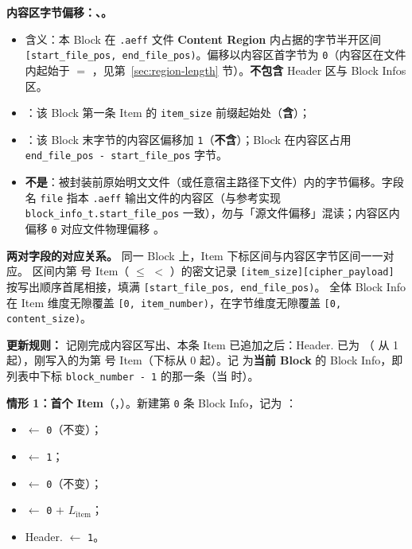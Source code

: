 \textbf{内容区字节偏移：、。}
\begin{itemize}
  \item 含义：本 Block 在 \texttt{.aeff} 文件 \textbf{Content Region} 内占据的字节半开区间 \texttt{[start\_file\_pos, end\_file\_pos)}。偏移以内容区首字节为 \texttt{0}（内容区在文件内起始于  $=$ ，见第~\ref{sec:region-length} 节）。\textbf{不包含} Header 区与 Block Infos 区。
  \item {}：该 Block 第一条 Item 的 \texttt{item\_size} 前缀起始处（\textbf{含}）；
  \item {}：该 Block 末字节的内容区偏移加 \texttt{1}（\textbf{不含}）；Block 在内容区占用 \texttt{end\_file\_pos - start\_file\_pos} 字节。
  \item \textbf{不是}：被封装前原始明文文件（或任意宿主路径下文件）内的字节偏移。字段名 \texttt{file} 指本 \texttt{.aeff} 输出文件的内容区（与参考实现 \texttt{block\_info\_t.start\_file\_pos} 一致），勿与「源文件偏移」混读；内容区内偏移 \texttt{0} 对应文件物理偏移 。
\end{itemize}

\textbf{两对字段的对应关系。}
同一 Block 上，Item 下标区间与内容区字节区间一一对应。
区间内第  号 Item（ $\le$  $<$ ）的密文记录 \texttt{[item\_size][cipher\_payload]} 按写出顺序首尾相接，填满 \texttt{[start\_file\_pos, end\_file\_pos)}。
全体 Block Info 在 Item 维度无隙覆盖 \texttt{[0, item\_number)}，在字节维度无隙覆盖 \texttt{[0, content\_size)}。

\textbf{更新规则：}
记刚完成内容区写出、本条 Item 已追加之后：Header. 已为 （ 从 1 起），刚写入的为第  号 Item（下标从 0 起）。记  为\textbf{当前 Block} 的 Block Info，即列表中下标 \texttt{block\_number - 1} 的那一条（当  时）。

\textbf{情形 1：首个 Item}（，）。新建第 \texttt{0} 条 Block Info，记为 ：
\begin{itemize}
  \item {} $\leftarrow$ \texttt{0}（不变）；
  \item {} $\leftarrow$ \texttt{1}；
  \item {} $\leftarrow$ \texttt{0}（不变）；
  \item {} $\leftarrow$ \texttt{0} $+$ $L_{\mathrm{item}}$；
  \item Header. $\leftarrow$ \texttt{1}。
\end{itemize}

